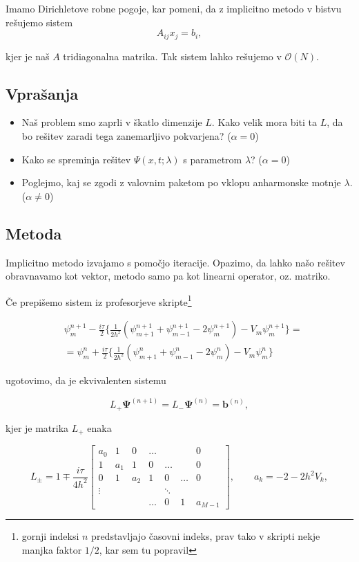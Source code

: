 \documentclass[a4 paper, 12pt]{article}
\begin{document}
Imamo Dirichletove robne pogoje, kar pomeni, da z implicitno metodo v bistvu rešujemo sistem
\[
	A_{ij}x_j = b_i,
\]

kjer je naš $A$ tridiagonalna matrika. Tak sistem lahko rešujemo v $\mathcal{O}(N)$.

\subsection{Vprašanja}
\begin{itemize}
	\item{Naš problem smo zaprli v škatlo dimenzije $L$. Kako velik mora biti ta $L$,
		da bo rešitev zaradi tega zanemarljivo pokvarjena? ($\alpha = 0$)}
	\item{Kako se spreminja rešitev $\Psi (x,t; \lambda)$ s parametrom $\lambda$?
		($\alpha = 0$)}
	\item{Poglejmo, kaj se zgodi z valovnim paketom po vklopu anharmonske motnje $\lambda$.
		($\alpha \neq 0$)}
\end{itemize}

\subsection{Metoda}

Implicitno metodo izvajamo s pomočjo iteracije. Opazimo, da lahko našo rešitev obravnavamo
kot vektor, metodo samo pa kot linearni operator, oz. matriko.

Če prepišemo sistem iz profesorjeve skripte\footnote{gornji indeksi $n$ predstavljajo časovni
indeks, prav tako v skripti nekje manjka faktor $1/2$, kar sem tu popravil}

\begin{align*}
	&\psi_m^{n+1} - \frac{i\tau}{2}\bigg\{\frac{1}{2h^2}\left(\psi_{m+1}^{n+1} +
		\psi_{m-1}^{n+1} - 2\psi_m^{n+1}\right) - V_m\psi_m^{n+1}\bigg\} = \\
		&= \psi_m^n + \frac{i\tau}{2}\bigg\{\frac{1}{2h^2}\left(\psi_{m+1}^n +
		\psi_{m-1}^n - 2\psi_m^n\right) - V_m\psi_m^n\bigg\}
\end{align*}

ugotovimo, da je ekvivalenten sistemu

\begin{equation}
	L_+ \mathbf{\Psi}^{(n+1)} = L_- \mathbf{\Psi}^{(n)} = \mathbf{b}^{(n)},
\end{equation}

kjer je matrika $L_+$ enaka

\begin{equation}
	L_\pm = 1 \mp \frac{i\tau}{4h^2}\begin{bmatrix}
		a_0 & 1 & 0 & \ldots & & & 0\\
		1 & a_1 & 1 & 0 & \ldots & & 0\\
		0 & 1 & a_2 & 1 & 0 & \ldots & 0\\
		\vdots & & & & \ddots \\
		& & & \ldots & 0 & 1 & a_{M-1} \end{bmatrix}, \qquad
	a_k = -2 - 2h^2V_k,
\end{equation}
\end{document}

